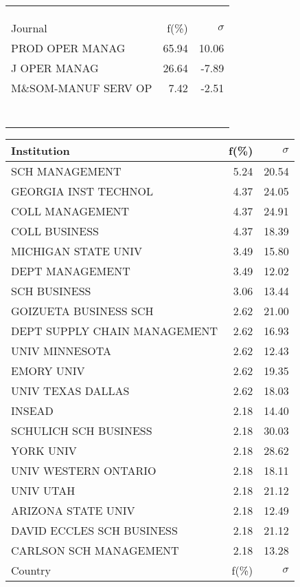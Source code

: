 \documentclass[a4paper,11pt]{report}
\begin{document}
\begin{landscape}
\begin{table}[!ht]
{\begin{tabular}{|l r  r|}
 &  & \\
 &  & \\
 &  & \\
\hline
\hline
Journal & f(\%) & $\sigma$\\
\hline
PROD OPER MANAG & 65.94 & 10.06\\
J OPER MANAG & 26.64 & -7.89\\
M\&SOM-MANUF SERV OP & 7.42 & -2.51\\
 &  & \\
 &  & \\
 &  & \\
 &  & \\
 &  & \\
 &  & \\
 &  & \\
\hline
\end{tabular}
}
{\scriptsize\begin{tabular}{|l r r|}
\hline
Institution & f(\%) & $\sigma$\\
\hline
SCH MANAGEMENT & 5.24 & 20.54\\
GEORGIA INST TECHNOL & 4.37 & 24.05\\
COLL MANAGEMENT & 4.37 & 24.91\\
COLL BUSINESS & 4.37 & 18.39\\
MICHIGAN STATE UNIV & 3.49 & 15.80\\
DEPT MANAGEMENT & 3.49 & 12.02\\
SCH BUSINESS & 3.06 & 13.44\\
GOIZUETA BUSINESS SCH & 2.62 & 21.00\\
DEPT SUPPLY CHAIN MANAGEMENT & 2.62 & 16.93\\
UNIV MINNESOTA & 2.62 & 12.43\\
EMORY UNIV & 2.62 & 19.35\\
UNIV TEXAS DALLAS & 2.62 & 18.03\\
INSEAD & 2.18 & 14.40\\
SCHULICH SCH BUSINESS & 2.18 & 30.03\\
YORK UNIV & 2.18 & 28.62\\
UNIV WESTERN ONTARIO & 2.18 & 18.11\\
UNIV UTAH & 2.18 & 21.12\\
ARIZONA STATE UNIV & 2.18 & 12.49\\
DAVID ECCLES SCH BUSINESS & 2.18 & 21.12\\
CARLSON SCH MANAGEMENT & 2.18 & 13.28\\
\hline
\hline
Country & f(\%) & $\sigma$\\

\end{tabular}}
\end{table}
\end{landscape}
\end{document}
